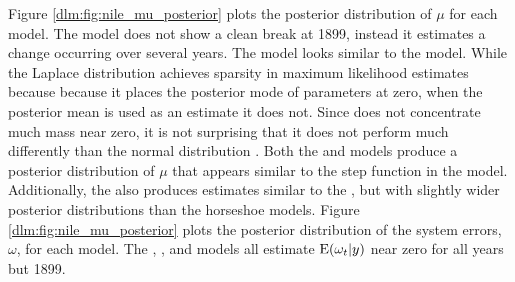 Figure \ref{dlm:fig:nile_mu_posterior} plots the posterior distribution of $\mu$ for each model.
The  model does not show a clean break at 1899, instead it estimates a change occurring over several years. 
The  model looks similar to the  model. 
While the Laplace distribution achieves sparsity in maximum likelihood estimates because because it places the posterior mode of parameters at zero, when the posterior mean is used as an estimate it does not. 
Since does not concentrate much mass near zero, it is not surprising that it does not perform much differently than the normal distribution \parencites{ParkCasella2008}.
Both the  and  models produce a posterior distribution of $\mu$ that appears similar to the step function in the  model.
Additionally, the  also produces estimates similar to the , but with slightly wider posterior distributions than the horseshoe models.
Figure \ref{dlm:fig:nile_mu_posterior} plots the posterior distribution of the system errors, $\omega$, for each model.
The , , and  models all estimate $\operatorname{E}(\omega_{t} | y)$ near zero for all years but 1899.

